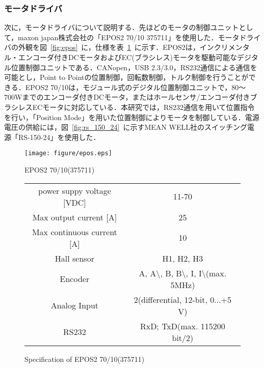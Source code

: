 \documentclass[a4paper,12pt]{article_vdlab_sotsuron}
\begin{document}
\subsubsection{モータドライバ}
次に，モータドライバについて説明する．先ほどのモータの制御ユニットとして，maxon japan株式会社の「EPOS2 70/10 375711」を使用した．モータドライバの外観を図~\ref{fig:epos}~に，仕様を表~\ref{tab:epos}~に示す．EPOS2は，インクリメンタル・エンコーダ付きDCモータおよびEC(ブラシレス)モータを駆動可能なデジタル位置制御ユニットである．CANopen，USB 2.3/3.0，RS232通信による通信を可能とし，Point to Pointの位置制御，回転数制御，トルク制御を行うことができる．EPOS2 70/10は，モジュール式のデジタル位置制御ユニットで，80～700Wまでのエンコーダ付きDCモータ，またはホールセンサ/エンコーダ付きブラシレスECモータに対応している．本研究では，RS232通信を用いて位置指令を行い，「Position Mode」を用いた位置制御によりモータを制御している．電源電圧の供給には，図~\ref{fig:rs_150_24}~に示すMEAN WELL社のスイッチング電源「RS-150-24」を使用した．

\vspace*{10mm}
\begin{figure}[htp]
  \begin{minipage}{0.4\textwidth}
    \begin{center}
      \texttt{[image: figure/epos.eps]}
      \vspace*{3mm}
      \caption{EPOS2 70/10(375711)}
    \label{fig:epos}
    \end{center}
  \end{minipage}
  \begin{minipage}{0.6\textwidth}
      \begin{center}
	\makeatletter
	\def\@captype{table}
	\makeatother
	\caption{Specification of EPOS2 70/10(375711)}
	\label{tab:epos}
	\begin{tabular}{cc}\hline
	  power suppy voltage [VDC] & 11-70\\
	  Max output current [A] & 25\\
	  Max continuous current [A] & 10\\
	  Hall sensor & H1, H2, H3 \\
	  Encoder & A, A$\setminus$, B, B$\setminus$, I, I$\setminus$(max. 5MHz)\\
	  Analog Input & 2(differential, 12-bit, 0...+5 V)\\
	  RS232 & RxD; TxD(max. 115200 bit/2) \\\hline
	  \end{tabular}
	\end{center}
  \end{minipage}
\end{figure}
\end{document}
